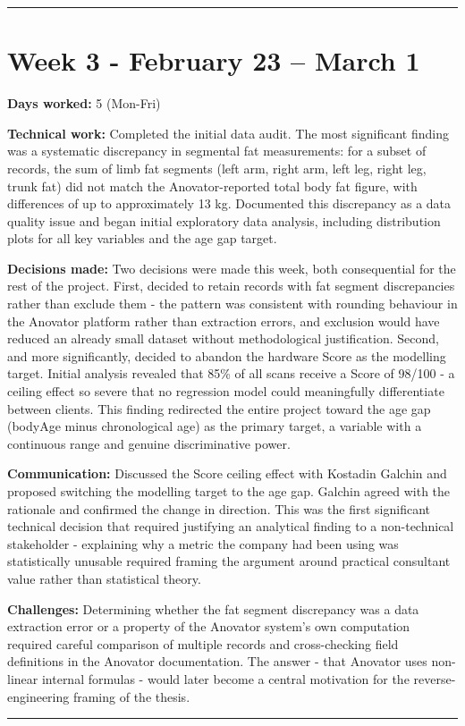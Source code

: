\documentclass[11pt,a4paper]{article}
\begin{document}
\noindent\rule{\textwidth}{0.4pt}


\section{Week 3  -  February 23 – March 1}

\textbf{Days worked:} 5 (Mon-Fri)

\textbf{Technical work:} Completed the initial data audit. The most significant finding was a systematic discrepancy in segmental fat measurements: for a subset of records, the sum of limb fat segments (left arm, right arm, left leg, right leg, trunk fat) did not match the Anovator-reported total body fat figure, with differences of up to approximately 13 kg. Documented this discrepancy as a data quality issue and began initial exploratory data analysis, including distribution plots for all key variables and the age gap target.

\textbf{Decisions made:} Two decisions were made this week, both consequential for the rest of the project. First, decided to retain records with fat segment discrepancies rather than exclude them  -  the pattern was consistent with rounding behaviour in the Anovator platform rather than extraction errors, and exclusion would have reduced an already small dataset without methodological justification. Second, and more significantly, decided to abandon the hardware Score as the modelling target. Initial analysis revealed that 85\% of all scans receive a Score of 98/100  -  a ceiling effect so severe that no regression model could meaningfully differentiate between clients. This finding redirected the entire project toward the age gap (bodyAge minus chronological age) as the primary target, a variable with a continuous range and genuine discriminative power.

\textbf{Communication:} Discussed the Score ceiling effect with Kostadin Galchin and proposed switching the modelling target to the age gap. Galchin agreed with the rationale and confirmed the change in direction. This was the first significant technical decision that required justifying an analytical finding to a non-technical stakeholder  -  explaining why a metric the company had been using was statistically unusable required framing the argument around practical consultant value rather than statistical theory.

\textbf{Challenges:} Determining whether the fat segment discrepancy was a data extraction error or a property of the Anovator system's own computation required careful comparison of multiple records and cross-checking field definitions in the Anovator documentation. The answer  -  that Anovator uses non-linear internal formulas  -  would later become a central motivation for the reverse-engineering framing of the thesis.
\noindent\rule{\textwidth}{0.4pt}
\end{document}
